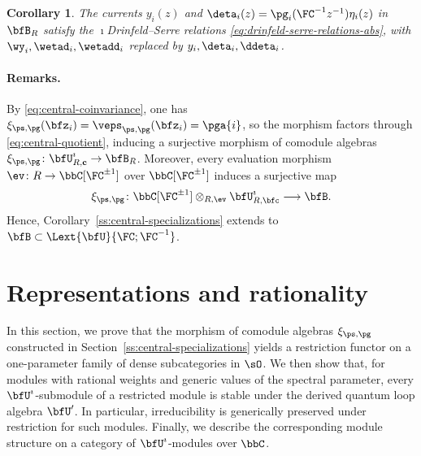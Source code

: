 \documentclass[reqno]{amsart}
\numberwithin{equation}{section}
\newtheorem*{corollary}{Corollary}
\newenvironment{remarks}{\medskip\paragraph{{\bf Remarks.} }}{\par\medskip}
\begin{document}
\begin{corollary}
The currents $y_i(z)$ and
$\deta_i(z)=\pg_i(\FC^{-1}z^{-1})\eta_i(z)$ in $\bfB_R$
satisfy the $\imath$Drinfeld--Serre relations \eqref{eq:drinfeld-serre-relations-abs}, with $\wy_i,\wetad_i, \wetadd_i$ replaced by $y_i,\deta_i, \ddeta_i$.
\end{corollary}

\begin{remarks}
By \eqref{eq:central-coinvariance}, one has
$\xi_{\ps,\pg}(\bfz_i)=\veps_{\ps,\pg}(\bfz_i)=\pga{i}$, so the
morphism factors through \eqref{eq:central-quotient}, inducing a surjective
morphism of comodule algebras 
$\xi_{\ps,\pg}\colon\bfU^\imath_{R,\mathbf c}\to\bfB_R$.	
Moreover, every evaluation morphism $\ev\colon R\to\bbC[\FC^{\pm1}]$ over $\bbC[\FC^{\pm1}]$ induces a surjective map 
\begin{equation}\label{eq:embedding}
\xi_{\ps,\pg}\colon\bbC[\FC^{\pm1}]\otimes_{R,\ev}\bfU^{\imath}_{R,\bfc}
\longrightarrow\bfB.
\end{equation}
Hence, Corollary~\ref{ss:central-specializations} extends to $\bfB\subset\Lext{\bfU}{\FC;\FC^{-1}}$.\hfill\rmkend
\end{remarks}


\section{Representations and rationality}\label{s:representations-rationality}
In this section, we prove that the morphism of comodule algebras $\xi_{\ps,\pg}$
constructed in Section~\ref{ss:central-specializations} yields a restriction functor on a one-parameter family of dense subcategories in $\sO$.
We then show that, for modules with rational weights and generic values of the spectral parameter, every $\bfU^\imath$-submodule of a restricted module is stable under the derived quantum loop algebra $\bfU'$. In particular, irreducibility is generically preserved under restriction for such modules. Finally, we describe the corresponding module structure on a category of $\bfU^\imath$-modules over $\bbC$.
\end{document}

